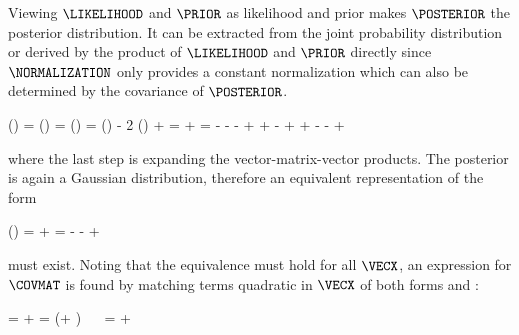         Viewing $\LIKELIHOOD$ and $\PRIOR$ as likelihood and prior makes
        $\POSTERIOR$ the posterior distribution. It can be extracted from
        the joint probability distribution or derived by the product of
        $\LIKELIHOOD$ and $\PRIOR$ directly since $\NORMALIZATION$ only
        provides a constant normalization which can also be determined by the
        covariance of $\POSTERIOR$.

        \placesubformula
        \startformula
        \startalign[n=2,align={right,left}]
             \ln(\POSTERIOR) =  \ln\left(\frac{\JOINT}{\NORMALIZATION}\right) \NR
            \NC =  \ln\left(\frac{\LIKELIHOOD \PRIOR}{\NORMALIZATION}\right) \NR
            \NC =  \ln(\LIKELIHOOD) - 2 \ln(\PRIOR) + \CONST \NR
            \NC = \NC \GAUSSEXP{\VECY}{\MATB \VECX - \VECB}{\MATQ}
                + \GAUSSEXP{\VECX}{\VECA}{\MATP} \NR
            \NC = \NC
                \VECYT \MATQ \VECY
                - \VECYT \MATQ \MATB \VECX
                - \VECYT \MATQ \VECB
                - \VECXT \MATBT \MATQ \VECY
                \NR
            \NC \NC
                + \VECXT \MATBT \MATQ \MATB \VECX
                + \VECXT \MATBT \MATQ \VECB
                - \VECBT \MATQ \VECY
                + \VECBT \MATQ \MATB \VECX
                \NR[eq:gaussprodexpand]
            \NC \NC
                + \VECXT \MATP \VECX
                - \VECXT \MATP \VECA
                - \VECAT \MATP \VECX
                + \CONST \EQCOMMA
                \NR
        \stopalign
        \stopformula

        where the last step is expanding the vector-matrix-vector products. The
        posterior is again a Gaussian distribution, therefore an equivalent
        representation of the form

        \placesubformula
        \startformula
        \startalign[n=2,align={right,left}]
             \ln(\POSTERIOR) = \NC
                \GAUSSEXP{\VECX}{\VECC}{\MATS} + \CONST \NR
            \NC = \NC
                 \VECXT \MATS \VECX
                 - \VECXT \MATS \VECC
                 - \VECCT \MATS \VECX
                 + \CONST \NR[eq:gausspostexpand]
        \stopalign
        \stopformula

        must exist. Noting that the equivalence must hold for all $\VECX$, an
        expression for $\COVMAT$ is found by matching terms quadratic in
        $\VECX$ of both forms  and
        :

        \startformula
        \startalign[n=3,align={left,right,left}]
            \NC \NC \VECXT \MATS \VECX = \NC
                \VECXT \MATBT \MATQ \MATB \VECX + \VECXT \MATP \VECX \NR
            \NC \NC = \NC
                \VECXT (\MATBT \MATQ \MATB + \MATP) \VECX \NR
            \NC \Rightarrow~~ \NC \MATS = \NC
                \MATBT \MATQ \MATB + \MATP
                \EQSTOP
        \stopalign
        \stopformula

